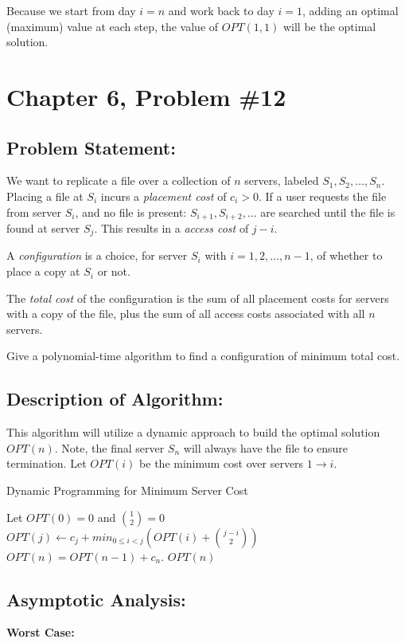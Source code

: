 \documentclass{article}
\begin{document}
Because we start from day $i = n$ and work back to day $i = 1$, adding an optimal (maximum) value at each step, the value of $OPT(1, 1)$ will be the optimal solution.
\newpage

\section*{Chapter 6, Problem \#12}

\subsection*{Problem Statement:}  
We want to replicate a file over a collection of $n$ servers, labeled $S_1, S_2, \dots , S_n$.  Placing a file at $S_i$ incurs a \textit{placement cost} of $c_i > 0$.
If a user requests the file from server $S_i$, and no file is present:  $S_{i+1}, S_{i+2}, \dots$ are searched until the file is found at server $S_j$.  This results in a \textit{access cost} of $j - i$.

A \textit{configuration} is a choice, for server $S_i$ with $i = 1, 2, \dots, n-1$, of whether to place a copy at $S_i$ or not.

The \textit{total cost} of the configuration is the sum of all placement costs for servers with a copy of the file, plus the sum of all access costs associated with all $n$ servers.

Give a polynomial-time algorithm to find a configuration of minimum total cost.

\subsection*{Description of Algorithm:}
This algorithm will utilize a dynamic approach to build the optimal solution $OPT(n)$.
Note, the final server $S_n$ will always have the file to ensure termination.
Let $OPT(i)$ be the minimum cost over servers $1 \rightarrow i$.  

\begin{algorithm}
\caption{Dynamic Programming for Minimum Server Cost}
\begin{algorithmic}
\State Let $OPT(0) = 0$ and $\binom{1}{2} = 0$
	\State $OPT(j) \gets c_j + min_{0 \leq i < j}(OPT(i) + \binom{j-i}{2} )$
\EndFor
\State $OPT(n) = OPT(n-1) + c_n$.
\State \Return $OPT(n)$
\end{algorithmic}
\end{algorithm}

\subsection*{Asymptotic Analysis:}
\noindent \textbf{Worst Case:}
\end{document}

